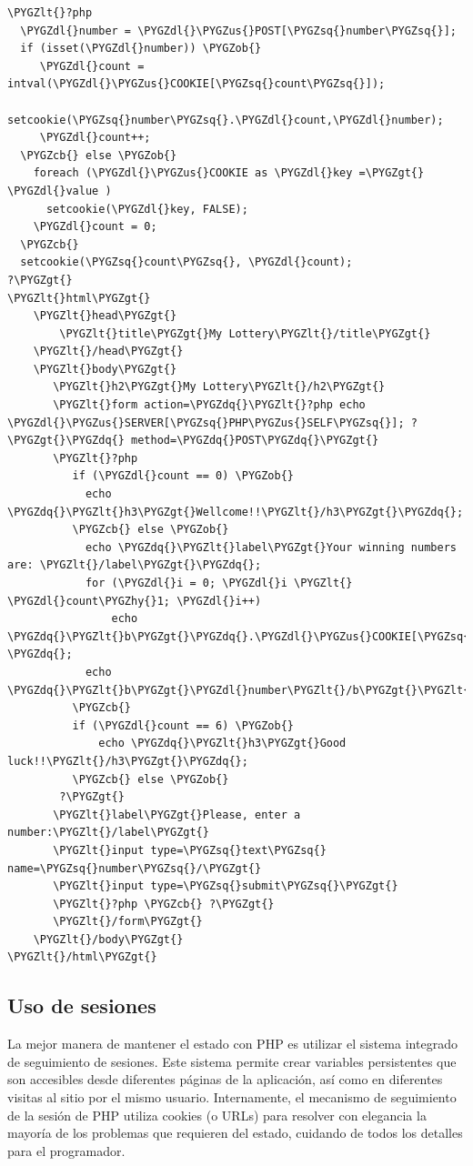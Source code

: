 \documentclass[a5paper,10pt,spanish]{sphinxmanual}
\def\PYGZus{\char`\_}
\def\PYGZob{\char`\{}
\def\PYGZcb{\char`\}}
\def\PYGZlt{\char`\<}
\def\PYGZgt{\char`\>}
\def\PYGZdl{\char`\$}
\def\PYGZhy{\char`\-}
\def\PYGZsq{\char`\'}
\def\PYGZdq{\char`\"}
\begin{document}
\begin{Verbatim}[commandchars=\\\{\}]
\PYGZlt{}?php
  \PYGZdl{}number = \PYGZdl{}\PYGZus{}POST[\PYGZsq{}number\PYGZsq{}];
  if (isset(\PYGZdl{}number)) \PYGZob{}
     \PYGZdl{}count = intval(\PYGZdl{}\PYGZus{}COOKIE[\PYGZsq{}count\PYGZsq{}]);
     setcookie(\PYGZsq{}number\PYGZsq{}.\PYGZdl{}count,\PYGZdl{}number);
     \PYGZdl{}count++;
  \PYGZcb{} else \PYGZob{}
    foreach (\PYGZdl{}\PYGZus{}COOKIE as \PYGZdl{}key =\PYGZgt{} \PYGZdl{}value )
      setcookie(\PYGZdl{}key, FALSE);
    \PYGZdl{}count = 0;
  \PYGZcb{}
  setcookie(\PYGZsq{}count\PYGZsq{}, \PYGZdl{}count);
?\PYGZgt{}
\PYGZlt{}html\PYGZgt{}
    \PYGZlt{}head\PYGZgt{}
        \PYGZlt{}title\PYGZgt{}My Lottery\PYGZlt{}/title\PYGZgt{}
    \PYGZlt{}/head\PYGZgt{}
    \PYGZlt{}body\PYGZgt{}
       \PYGZlt{}h2\PYGZgt{}My Lottery\PYGZlt{}/h2\PYGZgt{}
       \PYGZlt{}form action=\PYGZdq{}\PYGZlt{}?php echo \PYGZdl{}\PYGZus{}SERVER[\PYGZsq{}PHP\PYGZus{}SELF\PYGZsq{}]; ?\PYGZgt{}\PYGZdq{} method=\PYGZdq{}POST\PYGZdq{}\PYGZgt{}
       \PYGZlt{}?php
          if (\PYGZdl{}count == 0) \PYGZob{}
            echo \PYGZdq{}\PYGZlt{}h3\PYGZgt{}Wellcome!!\PYGZlt{}/h3\PYGZgt{}\PYGZdq{};
          \PYGZcb{} else \PYGZob{}
            echo \PYGZdq{}\PYGZlt{}label\PYGZgt{}Your winning numbers are: \PYGZlt{}/label\PYGZgt{}\PYGZdq{};
            for (\PYGZdl{}i = 0; \PYGZdl{}i \PYGZlt{} \PYGZdl{}count\PYGZhy{}1; \PYGZdl{}i++)
                echo \PYGZdq{}\PYGZlt{}b\PYGZgt{}\PYGZdq{}.\PYGZdl{}\PYGZus{}COOKIE[\PYGZsq{}number\PYGZsq{}.\PYGZdl{}i].\PYGZdq{}\PYGZlt{}/b\PYGZgt{}, \PYGZdq{};
            echo \PYGZdq{}\PYGZlt{}b\PYGZgt{}\PYGZdl{}number\PYGZlt{}/b\PYGZgt{}\PYGZlt{}/p\PYGZgt{}\PYGZdq{};
          \PYGZcb{}
          if (\PYGZdl{}count == 6) \PYGZob{}
              echo \PYGZdq{}\PYGZlt{}h3\PYGZgt{}Good luck!!\PYGZlt{}/h3\PYGZgt{}\PYGZdq{};
          \PYGZcb{} else \PYGZob{}
        ?\PYGZgt{}
       \PYGZlt{}label\PYGZgt{}Please, enter a number:\PYGZlt{}/label\PYGZgt{}
       \PYGZlt{}input type=\PYGZsq{}text\PYGZsq{} name=\PYGZsq{}number\PYGZsq{}/\PYGZgt{}
       \PYGZlt{}input type=\PYGZsq{}submit\PYGZsq{}\PYGZgt{}
       \PYGZlt{}?php \PYGZcb{} ?\PYGZgt{}
       \PYGZlt{}/form\PYGZgt{}
    \PYGZlt{}/body\PYGZgt{}
\PYGZlt{}/html\PYGZgt{}
\end{Verbatim}


\subsection{Uso de sesiones}
\label{Tutorial3_Sesiones.md:uso-de-sesiones}
La mejor manera de mantener el estado con PHP es utilizar el sistema
integrado de seguimiento de sesiones. Este sistema permite crear
variables persistentes que son accesibles desde diferentes páginas de la
aplicación, así como en diferentes visitas al sitio por el mismo
usuario. Internamente, el mecanismo de seguimiento de la sesión de PHP
utiliza cookies (o URLs) para resolver con elegancia la mayoría de los
problemas que requieren del estado, cuidando de todos los detalles para
el programador.
\end{document}
